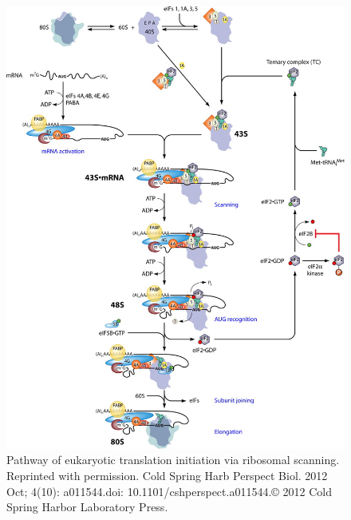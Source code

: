 \documentclass[
  12pt,
  openany]{book}
\begin{document}
\begin{figure}[ht]
\centering
\includegraphics[width=1.0\linewidth,height=0.8\textheight]{./figures/initiation.jpg} 
  \caption{Pathway of eukaryotic translation initiation via ribosomal scanning. Reprinted with permission. Cold Spring Harb Perspect Biol. 2012 Oct; 4(10): a011544.doi: 10.1101/cshperspect.a011544.© 2012 Cold Spring Harbor Laboratory Press.
  \label{fig:initiation}}
\end{figure}

\clearpage
\end{document}
